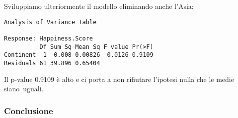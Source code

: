 \documentclass{beamer}
\newcommand{\fg}[2]{%
  \begin{center}
      \texttt{[image: \#2]}%
  \end{center}
}
\begin{document}
\begin{frame}
    Sviluppiamo ulteriormente il modello eliminando anche l'Asia:

\end{frame}

\begin{frame}[fragile]
    \tiny
    \begin{verbatim}
Analysis of Variance Table

Response: Happiness.Score
          Df Sum Sq Mean Sq F value Pr(>F)
Continent  1  0.008 0.00826  0.0126 0.9109
Residuals 61 39.896 0.65404  
    \end{verbatim}

    \normalsize Il p-value 0.9109 è alto e ci porta a non rifiutare l'ipotesi nulla che le medie siano uguali.
\end{frame}

\begin{frame}
    \frametitle{Conclusione}


\end{frame}
\end{document}
